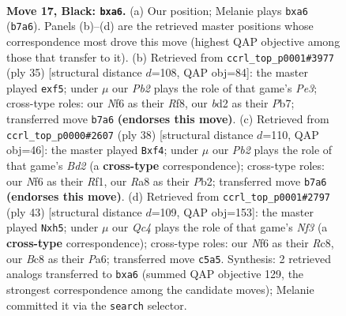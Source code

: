 \documentclass[11pt]{article}
\begin{document}
\clearpage

\begin{figure}[p]\centering
\begin{subfigure}{0.46\textwidth}\centering
\resizebox{\linewidth}{!}{%
\newchessgame
\chessboard[
  setfen={r1b1r1k1/ppp2pp1/P1n2n1p/2q4P/2P2P2/2P1P3/3B4/R2QKBNR b KQ - 0 17},
  showmover=false,
  pgfstyle=straightmove, color=movearrow, markmove={b7-a6}
]}
\caption{}
\end{subfigure}\hfill
\begin{subfigure}{0.46\textwidth}\centering
\resizebox{\linewidth}{!}{%
\newchessgame
\chessboard[
  setfen={r3brk1/1pp3pp/2n1pq2/3n1P2/p2P4/P4N1P/1PQBPPB1/2R1K2R b K - 0 18},
  showmover=false,
  pgfstyle=straightmove, color=movearrow, markmove={e6-f5}
]}
\caption{}
\end{subfigure}
\\[4pt]
\begin{subfigure}{0.46\textwidth}\centering
\resizebox{\linewidth}{!}{%
\newchessgame
\chessboard[
  setfen={1rb1qrk1/b5pp/p2ppp2/8/4PnPQ/RNNP4/1P1B1P1P/5RK1 w - - 3 20},
  showmover=false,
  pgfstyle=straightmove, color=movearrow, markmove={d2-f4}
]}
\caption{}
\end{subfigure}\hfill
\begin{subfigure}{0.46\textwidth}\centering
\resizebox{\linewidth}{!}{%
\newchessgame
\chessboard[
  setfen={2r2rk1/5pp1/p1bppn2/1p5P/2P1PP1q/2P2B1P/P2B2QK/R4R2 b - - 0 22},
  showmover=false,
  pgfstyle=straightmove, color=movearrow, markmove={f6-h5}
]}
\caption{}
\end{subfigure}
\caption{\textbf{Move 17, Black: \texttt{bxa6}.} (a) Our position; Melanie plays \texttt{bxa6} (\texttt{b7a6}). Panels (b)--(d) are the retrieved master positions whose correspondence most drove this move (highest QAP objective among those that transfer to it). (b) Retrieved from \texttt{ccrl\_top\_p0001\#3977} (ply 35) [structural distance $d$=108, QAP obj=84]: the master played \texttt{exf5}; under $\mu$ our \emph{Pb2} plays the role of that game's \emph{Pe3}; cross-type roles: our \emph{N}f6 as their \emph{R}f8, our \emph{b}d2 as their \emph{P}b7; transferred move \texttt{b7a6} \textbf{(endorses this move)}. (c) Retrieved from \texttt{ccrl\_top\_p0000\#2607} (ply 38) [structural distance $d$=110, QAP obj=46]: the master played \texttt{Bxf4}; under $\mu$ our \emph{Pb2} plays the role of that game's \emph{Bd2} (a \textbf{cross-type} correspondence); cross-type roles: our \emph{N}f6 as their \emph{R}f1, our \emph{R}a8 as their \emph{P}b2; transferred move \texttt{b7a6} \textbf{(endorses this move)}. (d) Retrieved from \texttt{ccrl\_top\_p0001\#2797} (ply 43) [structural distance $d$=109, QAP obj=153]: the master played \texttt{Nxh5}; under $\mu$ our \emph{Qc4} plays the role of that game's \emph{Nf3} (a \textbf{cross-type} correspondence); cross-type roles: our \emph{N}f6 as their \emph{R}c8, our \emph{B}c8 as their \emph{P}a6; transferred move \texttt{c5a5}. Synthesis: 2 retrieved analogs transferred to \texttt{bxa6} (summed QAP objective 129, the strongest correspondence among the candidate moves); Melanie committed it via the \texttt{search} selector.}
\label{fig:thought-m33}
\end{figure}
\end{document}
